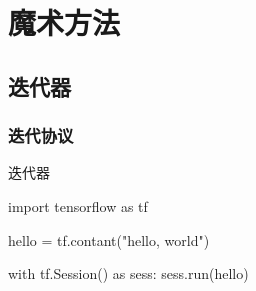 \begin{savequote}[45mm]
\end{savequote}

\chapter{魔术方法} 
\label{ch:magic-method}

\section{迭代器}

\begin{content}

\subsection{迭代协议}

\begin{nodiff}{迭代器}
 \begin{python}
import tensorflow as tf

hello = tf.contant("hello, world")

with tf.Session() as sess:
  sess.run(hello)
 \end{python}
\end{nodiff}

\end{content}
